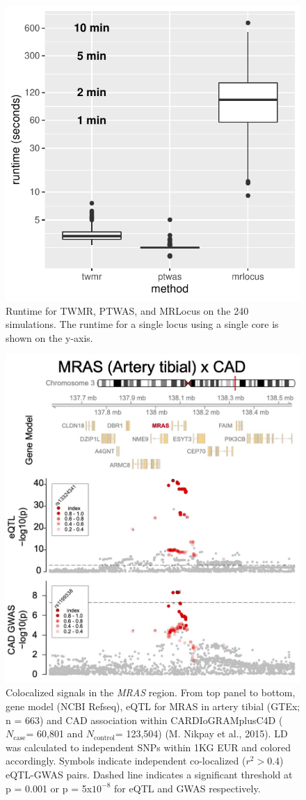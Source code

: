 \documentclass[11pt]{article}
\newcommand{\Ncase}{$N_{\textrm{case}}$\xspace}
\newcommand{\Ncontrol}{$N_{\textrm{control}}$\xspace}
\begin{document}
\begin{figure}[!ht]
  \centering
  \includegraphics[width=.7\textwidth]{figs/runtime}
  \caption{Runtime for TWMR, PTWAS, and MRLocus on the 240
    simulations. The runtime for a single locus using a single core is
    shown on the y-axis.}
\end{figure}

\begin{figure}[!ht]
  \centering
  \includegraphics[width=.7\textwidth]{figs/region_mras.jpg}
  \caption{Colocalized signals in the \emph{MRAS} region. From top panel to
    bottom, gene model (NCBI Refseq), eQTL for MRAS in artery tibial
    (GTEx; n = 663) and CAD association within CARDIoGRAMplusC4D
    (\Ncase = 60,801 and \Ncontrol = 123,504) (M. Nikpay et al.,
    2015). LD was calculated to independent SNPs within 1KG EUR and
    colored accordingly. Symbols indicate independent co-localized
    ($r^2 > 0.4$) eQTL-GWAS pairs. Dashed line indicates a significant
    threshold at p = 0.001 or p = 5x$10^{-8}$ for eQTL and GWAS
    respectively.}
\end{figure}
\end{document}

